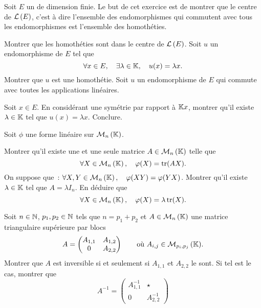 \documentclass{magnolia}
\begin{document}
Soit $E$ un \Kev de dimension finie. Le but de cet exercice est de montrer que
le centre de $\mathcal{L}\left(E\right)$, c'est à dire l'ensemble des endomorphismes qui
commutent avec tous les endomorphismes est l'ensemble des homothéties.
\begin{questions}
\question Montrer que les homothéties sont dans le centre de $\mathcal{L}\left(E\right)$.
\question Soit $u$ un endomorphisme de $E$ tel que
  \[\forall x\in E ,\quad \exists \lambda\in\mathbb{K} ,\quad  u(x)=\lambda x.\]
  Montrer que $u$ est une homothétie.
\question Soit $u$ un endomorphisme de $E$ qui commute avec toutes les
  applications linéaires.
  \begin{questions}
  \question Soit $x\in E$. En considérant une symétrie par rapport à $\mathbb{K} x$,
    montrer qu'il existe $\lambda\in\mathbb{K}$ tel que $u(x)=\lambda x$.
  \question Conclure.
  \end{questions}
\end{questions}

Soit $\phi$ une forme linéaire sur $\mathcal{M}_{n}\left(\mathbb{K}\right)$. 
\begin{questions}
\question Montrer qu'il
  existe une et une seule matrice $A\in\mathcal{M}_{n}\left(\mathbb{K}\right)$ telle que
  \[\forall X\in\mathcal{M}_{n}\left(\mathbb{K}\right) ,\quad \varphi(X)=\operatorname{tr}(AX).\]
\question On suppose que~: $\forall X,Y\in\mathcal{M}_{n}\left(\mathbb{K}\right) ,\quad \varphi(XY)=\varphi(YX)$.
  Montrer qu'il existe $\lambda\in\mathbb{K}$ tel que $A=\lambda I_n$. En déduire que
  \[\forall X\in\mathcal{M}_{n}\left(\mathbb{K}\right) ,\quad \varphi(X)=\lambda \operatorname{tr}(X).\]
\end{questions}

Soit $n\in\mathbb{N}$, $p_1,p_2\in\mathbb{N}$ tels que $n=p_1+p_2$ et $A\in\mathcal{M}_{n}\left(\mathbb{K}\right)$ une matrice
triangulaire supérieure par blocs
\[A=
  \begin{pmatrix}
  A_{1,1} & A_{1,2}\\
  0 & A_{2,2}
\end{pmatrix} \qquad \text{où $A_{i,j}\in\mathcal{M}_{p_i,p_j}\left(\mathbb{K}\right)$.}\]
Montrer que $A$ est inversible si et seulement si $A_{1,1}$ et $A_{2,2}$ le
sont. Si tel est le cas, montrer que
\[A^{-1}=
  \begin{pmatrix}
  A_{1,1}^{-1} & \star \\
  0 & A_{2,2}^{-1}
\end{pmatrix}\]

\end{document}
